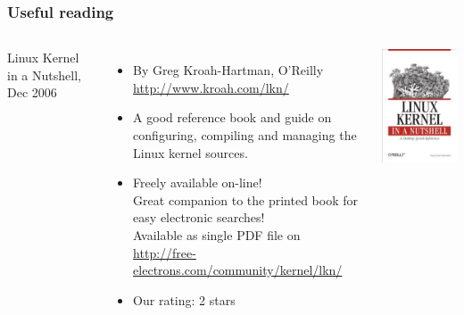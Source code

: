 \begin{frame}
  \frametitle{Useful reading}
  \begin{columns}
    Linux Kernel in a Nutshell, Dec 2006
    \begin{itemize}
    \item By Greg Kroah-Hartman, O'Reilly\\
      \url{http://www.kroah.com/lkn/}
    \item A good reference book and guide on configuring, compiling
      and managing the Linux kernel sources.
    \item Freely available on-line!\\
      Great companion to the printed book for easy electronic searches!\\
      Available as single PDF file on
      \url{http://free-electrons.com/community/kernel/lkn/}
    \item Our rating: 2 stars
    \end{itemize}
    \includegraphics[width=\textwidth]{slides/sysdev-linux-intro-modules/linux-kernel-in-a-nutshell.jpg}
  \end{columns}
\end{frame}

